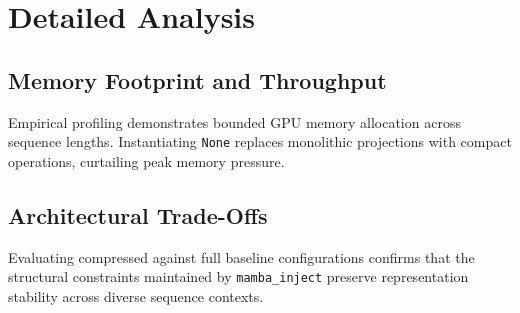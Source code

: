 \section{Detailed Analysis}

\subsection{Memory Footprint and Throughput}
Empirical profiling demonstrates bounded GPU memory allocation across sequence lengths. Instantiating \texttt{None} replaces monolithic projections with compact operations, curtailing peak memory pressure.

\subsection{Architectural Trade-Offs}
Evaluating compressed against full baseline configurations confirms that the structural constraints maintained by \texttt{mamba_inject} preserve representation stability across diverse sequence contexts.
